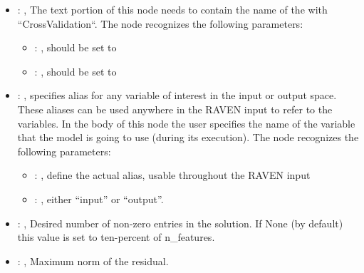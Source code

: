 \begin{itemize}
\begin{itemize}
        \item {}: ,
          List of IDs of features/variables to include in the transformation process.

        \item {}: ,
          Which space to search? Target or Feature?
      \end{itemize}

    \item {}: ,
      The text portion of this node needs to contain the name of the  with
               ``CrossValidation``.
      The  node recognizes the following parameters:
        \begin{itemize}
          \item {}: ,
            should be set to 
          \item {}: ,
            should be set to 
      \end{itemize}

    \item {}: ,
      specifies alias for         any variable of interest in the input or output space. These
      aliases can be used anywhere in the RAVEN input to         refer to the variables. In the body
      of this node the user specifies the name of the variable that the model is going to use
      (during its execution).
      The  node recognizes the following parameters:
        \begin{itemize}
          \item {}: ,
            define the actual alias, usable throughout the RAVEN input
          \item {}: ,
            either ``input'' or ``output''.
      \end{itemize}

    \item {}: ,
      Desired number of non-zero entries in the solution. If None (by default)
      this value is set to ten-percent of n\_features.

    \item {}: ,
      Maximum norm of the residual.


\end{itemize}
